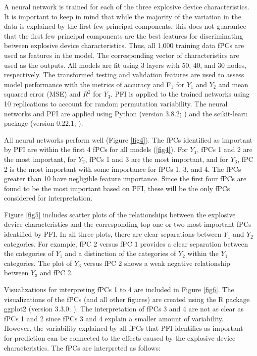 \documentclass[letterpaper]{article}
\begin{document}
A neural network is trained for each of the three explosive device characteristics. It is important to keep in mind that while the majority of the variation in the data is explained by the first few principal components, this does not guarantee that the first few principal components are the best features for discriminating between explosive device characteristics. Thus, all 1,000 training data fPCs are used as features in the model. The corresponding vector of characteristics are used as the outputs. All models are fit using 3 layers with 50, 40, and 30 nodes, respectively. The transformed testing and validation features are used to assess model performance with the metrics of accuracy and F\(_1\) for \(Y_1\) and \(Y_2\) and mean squared error (MSE) and \(R^2\) for \(Y_3\). PFI is applied to the trained networks using 10 replications to account for random permutation variability. The neural networks and PFI are applied using Python (version 3.8.2; \citeauthor{vanrossum:2009} \citeyear{vanrossum:2009}) and the scikit-learn package (version 0.22.1; \citeauthor{pedregosa:2011} \citeyear{pedregosa:2011}).

All neural networks perform well (Figure \ref{fig4}). The fPCs identified as important by PFI are within the first 4 fPCs for all models (\ref{fig4}). For \(Y_1\), fPCs 1 and 2 are the most important, for \(Y_2\), fPCs 1 and 3 are the most important, and for \(Y_3\), fPC 2 is the most important with some importance for fPCs 1, 3, and 4. The fPCs greater than 10 have negligible feature importance. Since the first four fPCs are found to be the most important based on PFI, these will be the only fPCs considered for interpretation.

Figure \ref{fig5} includes scatter plots of the relationships between the explosive device characteristics and the corresponding top one or two most important fPCs identified by PFI. In all three plots, there are clear separations between \(Y_1\) and \(Y_2\) categories. For example, fPC 2 versus fPC 1 provides a clear separation between the categories of \(Y_1\) and a distinction of the categories of \(Y_2\) within the \(Y_1\) categories. The plot of \(Y_3\) versus fPC 2 shows a weak negative relationship between \(Y_3\) and fPC 2.

Visualizations for interpreting fPCs 1 to 4 are included in Figure \ref{fig6}. The visualizations of the fPCs (and all other figures) are created using the R package ggplot2 (version 3.3.0; \citeauthor{wickham:2016} \citeyear{wickham:2016}). The interpretation of fPCs 3 and 4 are not as clear as fPCs 1 and 2 since fPCs 3 and 4 explain a smaller amount of variability. However, the variability explained by all fPCs that PFI identifies as important for prediction can be connected to the effects caused by the explosive device characteristics. The fPCs are interpreted as follows:
\end{document}
